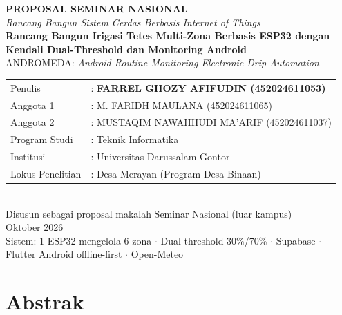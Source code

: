 \documentclass[12pt,a4paper,oneside]{report}
\begin{document}
\begin{titlepage}
\centering
\vspace*{1.5cm}
{\large\textbf{PROPOSAL SEMINAR NASIONAL}}\\[0.4cm]
{\small\textit{Rancang Bangun Sistem Cerdas Berbasis Internet of Things}}\\[1.2cm]
{\Large\bfseries Rancang Bangun Irigasi Tetes Multi-Zona Berbasis ESP32 dengan Kendali Dual-Threshold dan Monitoring Android}\\[0.6cm]
{\large ANDROMEDA: \textit{Android Routine Monitoring Electronic Drip Automation}}\\[1.5cm]
\begin{tabular}{ll}
Penulis & : \textbf{FARREL GHOZY AFIFUDIN (452024611053)} \\
Anggota 1 & : M. FARIDH MAULANA (452024611065) \\
Anggota 2 & : MUSTAQIM NAWAHHUDI MA'ARIF (452024611037) \\
Program Studi & : Teknik Informatika \\
Institusi & : Universitas Darussalam Gontor \\
Lokus Penelitian & : Desa Merayan (Program Desa Binaan) \\
\end{tabular}\\[1.5cm]
{\small Disusun sebagai proposal makalah Seminar Nasional (luar kampus)\\Oktober 2026}\\[2cm]
\vfill
{\small Sistem: 1 ESP32 mengelola 6 zona $\cdot$ Dual-threshold 30\%/70\% $\cdot$ Supabase $\cdot$ Flutter Android offline-first $\cdot$ Open-Meteo}
\end{titlepage}

\tableofcontents
\clearpage
{}

\chapter*{Abstrak}
\end{document}
